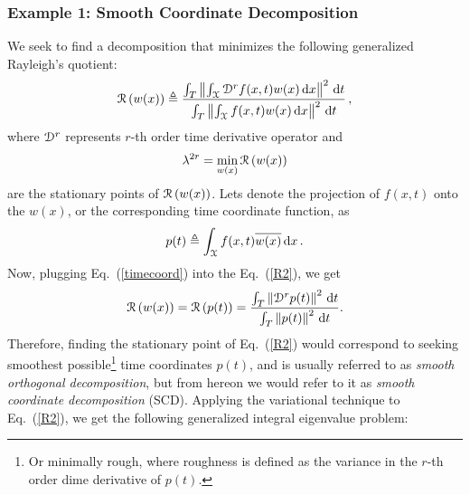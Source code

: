 \documentclass[10pt]{article}
\newcommand{\norm}[1]{\left\Vert#1\right\Vert}
\newcommand{\eq}[1]{Eq.\ (\ref{#1})}
\begin{document}
\subsubsection{Example 1: Smooth Coordinate Decomposition}

We seek to find a decomposition that minimizes the following generalized Rayleigh's quotient:
\begin{equation}\label{R2}
    {\cal R}\left(w(x)\right) \triangleq
    \frac{
    \int_T \norm{ 
    \int_{\cal X} {\cal D}^{r}  f(x,t) w(x)\,\mathrm{d} x
    }^2 \,\mathrm{d} t
    }{
    \int_T \norm{
    \int_{\cal X}  f(x,t) w(x)\, \mathrm{d} x
    }^2 \,\mathrm{d} t 
    }\,,
\end{equation}
where ${\cal D}^{r}$ represents $r$-th order time derivative operator and
\begin{equation}
    \lambda^{2r} = \underset{w(x)}{\min}\, {\cal R}\left(w(x)\right)
\end{equation}
are the stationary points of ${\cal R}\left(w(x)\right)$. Lets denote the projection of $ f(x,t)$ onto the  $w(x)$, or the corresponding time coordinate function, as
\begin{equation}\label{timecoord}
    p(t) \triangleq %
    \int_{\cal X}  f(x,t)\overline {w(x)} \,\mathrm{d}x\,.
\end{equation}
Now, plugging \eq{timecoord} into the \eq{R2}, we get
\begin{equation}
    {\cal R}\left(w(x)\right) = {\cal R}\left(p(t)\right) =
    \frac{
    \int_T \norm{ 
    {\cal D}^{r} p(t)
    }^2 \,\mathrm{d} t
    }{
    \int_T 
    \norm{p(t)}
    ^2 \,\mathrm{d} t 
    }.    
\end{equation}
Therefore, finding the stationary point of \eq{R2} would correspond to seeking smoothest possible\footnote{Or minimally rough, where roughness is defined as the variance in the $r$-th order dime derivative of $p(t)$.} time coordinates $p(t)$, and is usually referred to as {\em smooth orthogonal decomposition}, but from hereon we would refer to it as {\em smooth coordinate decomposition} (SCD). Applying the variational technique to \eq{R2}, we get the following generalized integral eigenvalue problem:
\end{document}
